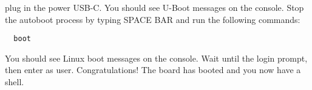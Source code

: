 plug in the power USB-C. You should see U-Boot messages on the console.
Stop the autoboot process by typing SPACE BAR and run the following commands:

\begin{verbatim}
  boot
\end{verbatim}

You should see Linux boot messages on the console.
Wait until the login prompt, then enter  as user.
Congratulations! The board has booted and you now have a shell.
